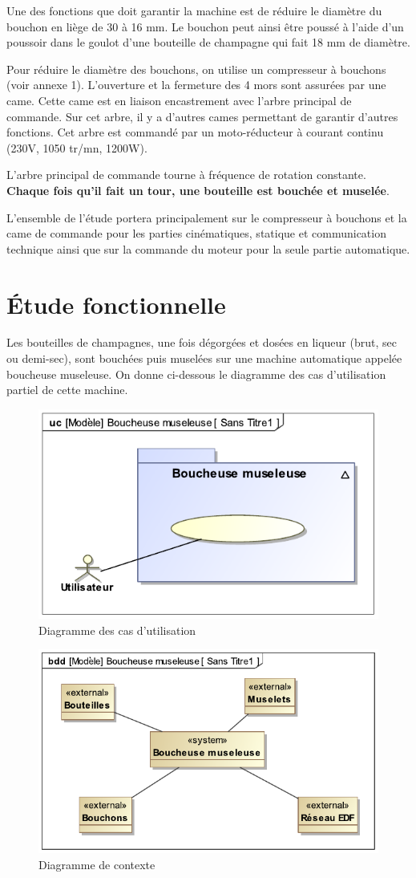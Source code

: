 Une des fonctions que doit garantir la machine est de réduire le diamètre du bouchon en liège de 30 à 16 mm. Le bouchon peut ainsi être poussé à l'aide d'un poussoir dans le goulot d'une bouteille de champagne qui fait 18 mm de diamètre.

Pour réduire le diamètre des bouchons, on utilise un compresseur à bouchons (voir annexe 1). L'ouverture et la fermeture des 4 mors sont assurées par une came. Cette came est en liaison encastrement avec l'arbre principal de commande. Sur cet arbre, il y a d'autres cames permettant de garantir d'autres fonctions. Cet arbre est commandé par un moto-réducteur à courant continu (230V, 1050 tr/mn, 1200W).

L'arbre principal de commande tourne à fréquence de rotation constante. \textbf{Chaque fois qu'il fait un tour, une bouteille est bouchée et muselée}.

L'ensemble de l'étude portera principalement sur le compresseur à bouchons et la came de commande pour les parties cinématiques, statique et communication technique ainsi que sur la commande du moteur pour la seule partie automatique.

\section{Étude fonctionnelle}

Les bouteilles de champagnes, une fois dégorgées et dosées en liqueur (brut, sec ou demi-sec), sont bouchées puis muselées sur une machine automatique appelée boucheuse museleuse. On donne ci-dessous le diagramme des cas d'utilisation partiel de cette machine.

\begin{figure}[!h]
\begin{center}
	\includegraphics[width=0.4\linewidth]{img/fig02}
\end{center}
\caption{Diagramme des cas d'utilisation}
\label{fig02}
\end{figure} 


\begin{figure}[!h]
\begin{center}
	\includegraphics[width=0.4\linewidth]{img/fig03}
\end{center}
\caption{Diagramme de contexte}
\label{fig03}
\end{figure} 

